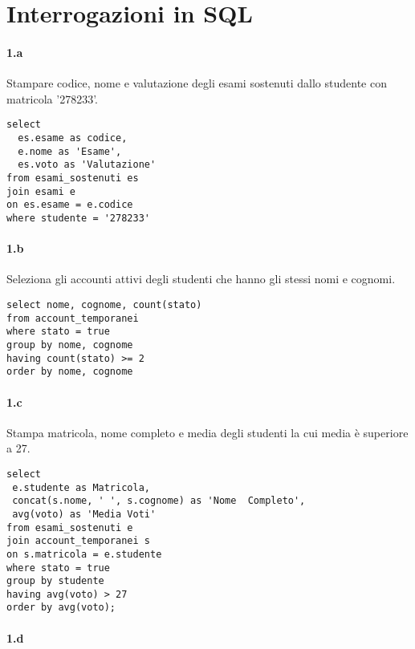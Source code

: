 \section{Interrogazioni in SQL}%
\label{sec:Interrogazioni in SQL}

\paragraph{1.a}%
\label{par:1.a}

Stampare codice, nome e valutazione degli esami sostenuti dallo
studente con matricola '278233'.

\begin{verbatim}
select
  es.esame as codice,
  e.nome as 'Esame',
  es.voto as 'Valutazione'
from esami_sostenuti es
join esami e
on es.esame = e.codice
where studente = '278233'
\end{verbatim}

\paragraph{1.b}%
\label{par:1.b}

Seleziona gli accounti attivi degli studenti che hanno gli
stessi nomi e cognomi.

\begin{verbatim}
select nome, cognome, count(stato)
from account_temporanei
where stato = true
group by nome, cognome
having count(stato) >= 2
order by nome, cognome
\end{verbatim}

\paragraph{1.c}%
\label{par:1.c}

Stampa matricola, nome completo e media degli studenti la cui
media è superiore a 27.

\begin{verbatim}
select
 e.studente as Matricola,
 concat(s.nome, ' ', s.cognome) as 'Nome  Completo',
 avg(voto) as 'Media Voti'
from esami_sostenuti e
join account_temporanei s
on s.matricola = e.studente
where stato = true
group by studente
having avg(voto) > 27
order by avg(voto);
\end{verbatim}


\paragraph{1.d}%
\label{par:1.d}

